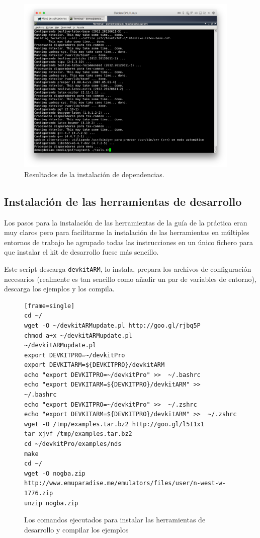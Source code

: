 \documentclass[12pt,english]{article}
\begin{document}
\begin{figure}[h!]
	\caption{Resultados de la instalación de dependencias.}
	\label{fig:dependency}
	\centering
	\includegraphics[width=0.95\textwidth]{P1Media/Dependencias}
\end{figure}
	
	\subsection{Instalación de las herramientas de desarrollo}
	
	Los pasos para la instalación de las herramientas de la guía de la práctica eran muy claros pero para facilitarme la instalación de las herramientas en múltiples entornos de trabajo he agrupado todas las instrucciones en un único fichero para que instalar el kit de desarrollo fuese más sencillo.
	
	Este script descarga {\tt devkitARM}, lo instala, prepara los archivos de configuración necesarios (realmente es tan sencillo como añadir un par de variables de entorno), descarga los ejemplos y los compila.
	
\begin{figure}[ht]
\begin{verbatim}[frame=single]
cd ~/
wget -O ~/devkitARMupdate.pl http://goo.gl/rjbq5P
chmod a+x ~/devkitARMupdate.pl
~/devkitARMupdate.pl
export DEVKITPRO=~/devkitPro
export DEVKITARM=${DEVKITPRO}/devkitARM
echo "export DEVKITPRO=~/devkitPro" >>  ~/.bashrc
echo "export DEVKITARM=${DEVKITPRO}/devkitARM" >>  ~/.bashrc
echo "export DEVKITPRO=~/devkitPro" >>  ~/.zshrc
echo "export DEVKITARM=${DEVKITPRO}/devkitARM" >>  ~/.zshrc
wget -O /tmp/examples.tar.bz2 http://goo.gl/l5I1x1
tar xjvf /tmp/examples.tar.bz2
cd ~/devkitPro/examples/nds
make
cd ~/
wget -O nogba.zip http://www.emuparadise.me/emulators/files/user/n-west-w-1776.zip
unzip nogba.zip
\end{verbatim}
	\label{fig:installToolkit}
	\caption{Los comandos ejecutados para instalar las herramientas de desarrollo y compilar los ejemplos}
\end{figure}
\end{document}
